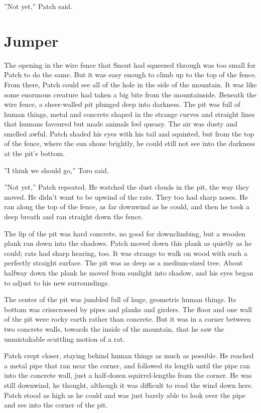 \documentclass[12pt]{book}
\begin{document}
''Not yet,'' Patch said.


\section{Jumper}

The opening in the wire fence that Snout had squeezed through was too
small for Patch to do the same. But it was easy enough to climb up to
the top of the fence. From there, Patch could see all of the hole in
the side of the mountain. It was like some enormous creature had taken
a big bite from the mountainside. Beneath the wire fence, a
sheer-walled pit plunged deep into darkness. The pit was full of human
things, metal and concrete shaped in the strange curves and straight
lines that humans favoured but made animals feel queasy. The air was
dusty and smelled awful. Patch shaded his eyes with his tail and
squinted, but from the top of the fence, where the sun shone brightly,
he could still not see into the darkness at the pit's bottom.

''I think we should go,'' Toro said.

''Not yet,'' Patch repeated. He watched the dust clouds in the pit,
the way they moved. He didn't want to be upwind of the rats. They too
had sharp noses. He ran along the top of the fence, as far downwind as
he could, and then he took a deep breath and ran straight down the
fence.

The lip of the pit was hard concrete, no good for downclimbing, but a
wooden plank ran down into the shadows. Patch moved down this plank as
quietly as he could; rats had sharp hearing, too. It was strange to
walk on wood with such a perfectly straight surface. The pit was as
deep as a medium-sized tree. About halfway down the plank he moved
from sunlight into shadow, and his eyes began to adjust to his new
surroundings.

The center of the pit was jumbled full of huge, geometric human
things. Its bottom was crisscrossed by pipes and planks and
girders. The floor and one wall of the pit were rocky earth rather
than concrete. But it was in a corner between two concrete walls,
towards the inside of the mountain, that he saw the unmistakable
scuttling motion of a rat.

Patch crept closer, staying behind human things as much as
possible. He reached a metal pipe that ran near the corner, and
followed its length until the pipe ran into the concrete wall, just a
half-dozen squirrel-lengths from the corner. He was still downwind, he
thought, although it was difficult to read the wind down here. Patch
stood as high as he could and was just barely able to look over the
pipe and see into the corner of the pit.
\end{document}
